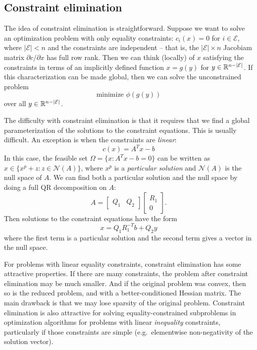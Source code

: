 \documentclass[12pt, leqno]{article} %
\begin{document}
\subsection*{Constraint elimination}

%

The idea of constraint elimination is straightforward.  Suppose we
want to solve an optimization problem with only equality constraints:
$c_i(x) = 0$ for $i \in \mathcal{E}$, where $|\mathcal{E}| < n$ and
the constraints are independent -- that is, the
$|\mathcal{E}| \times n$ Jacobiam matrix $\partial c / \partial x$
has full row rank.  Then we can think (locally) of $x$ satisfying the
constraints in terms of an implicitly defined function $x = g(y)$
for $y \in \mathbb{R}^{n-|\mathcal{E}|}$.  If this characterization can be
made global, then we can solve the unconstrained problem
\[
  \mbox{minimize } \phi(g(y))
\]
over all $y \in \mathbb{R}^{n-|\mathcal{E}|}$.

The difficulty with constraint elimination is that it requires that we
find a global parameterization of the solutions to the constraint
equations.  This is usually difficult.  An exception is when the
constraints are {\em linear}:
\[
  c(x) = A^T x - b
\]
In this case, the feasible set $\Omega = \{ x : A^T x - b = 0 \}$ can
be written as $x \in \{ x^p + z : z \in \mathcal{N}(A) \}$, where $x^p$
is a {\em particular solution} and $\mathcal{N}(A)$ is the null space
of $A$.  We can find both a particular solution and the null space by
doing a full QR decomposition on $A$:
\[
A = \begin{bmatrix} Q_1 & Q_2 \end{bmatrix}
    \begin{bmatrix} R_1 \\ 0 \end{bmatrix}.
\]
Then solutions to the constraint equations have the form
\[
  x = Q_1 R_1^{-T} b + Q_2 y
\]
where the first term is a particular solution and the second term
gives a vector in the null space.

For problems with linear equality constraints, constraint elimination
has some attractive properties.  If there are many constraints, the
problem after constraint elimination may be much smaller.  And if the
original problem was convex, then so is the reduced problem, and with
a better-conditioned Hessian matrix.  The main drawback is that we
may lose sparsity of the original problem.  Constraint elimination is
also attractive for solving equality-constrained subproblems in
optimization algorithms for problems with linear {\em inequality}
constraints, particularly if those constraints are simple
(e.g.~elementwise non-negativity of the solution vector).
\end{document}
